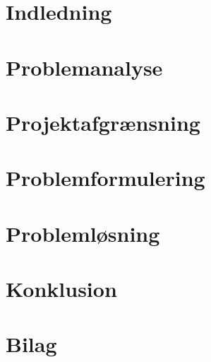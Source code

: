 \documentclass[12pt,hidelinks]{article}
\begin{document}
    \sloppy

    \newpage

    \newpage
    \tableofcontents
    \newpage
    \section{Indledning}

	\newpage
    \section{Problemanalyse}
    
    \newpage
    \section{Projektafgrænsning}

	\newpage
    \section{Problemformulering}

    \newpage
    \section{Problemløsning}

	\newpage
    \section{Konklusion}

    \newpage
    
    

	\newpage
    \section{Bilag}

    \newpage
    \begin{appendices}

    \end{appendices}
\end{document}
